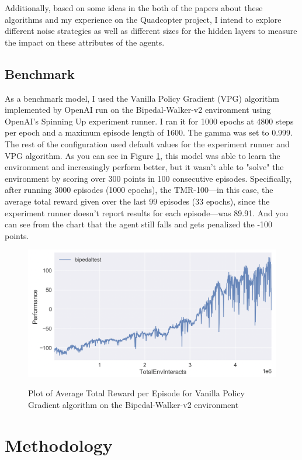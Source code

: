 \documentclass{article}
\begin{document}
Additionally, based on some ideas in the both of the papers about these algorithms and my experience on the Quadcopter project, I intend to explore different noise strategies as well as different sizes for the hidden layers to measure the impact on these attributes of the agents.


\subsection{Benchmark}
As a benchmark model, I used the Vanilla Policy Gradient (VPG) algorithm implemented by OpenAI run on the Bipedal-Walker-v2 environment using OpenAI's Spinning Up experiment runner. I ran it for 1000 epochs at 4800 steps per epoch and a maximum episode length of 1600. The gamma was set to 0.999. The rest of the configuration used default values for the experiment runner and VPG algorithm. As you can see in Figure \ref{fig:benchmark_results}, this model was able to learn the environment and increasingly perform better, but it wasn't able to "solve" the environment by scoring over 300 points in 100 consecutive episodes. Specifically, after running 3000 episodes (1000 epochs), the TMR-100—in this case, the average total reward given over the last 99 episodes (33 epochs), since the experiment runner doesn't report results for each episode—was 89.91. And you can see from the chart that the agent still falls and gets penalized the -100 points. 

\begin{figure}[ht]
\caption{Plot of Average Total Reward per Episode for Vanilla Policy Gradient algorithm on the Bipedal-Walker-v2 environment}
\centering
\includegraphics[scale=0.4]{images/bipedal-vpg-performance-plot.png}
\label{fig:benchmark_results}
\end{figure}


\section{Methodology}
\label{sec:methodology}
\end{document}
